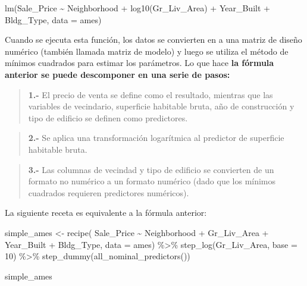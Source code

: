 \documentclass[
]{book}
\newenvironment{Shaded}{\begin{snugshade}}{\end{snugshade}}
\newcommand{\AttributeTok}[1]{\textcolor[rgb]{0.77,0.63,0.00}{#1}}
\newcommand{\DecValTok}[1]{\textcolor[rgb]{0.00,0.00,0.81}{#1}}
\newcommand{\FunctionTok}[1]{\textcolor[rgb]{0.00,0.00,0.00}{#1}}
\newcommand{\NormalTok}[1]{#1}
\newcommand{\OtherTok}[1]{\textcolor[rgb]{0.56,0.35,0.01}{#1}}
\newcommand{\SpecialCharTok}[1]{\textcolor[rgb]{0.00,0.00,0.00}{#1}}
\begin{document}
\begin{Shaded}
\begin{Highlighting}[]
\FunctionTok{lm}\NormalTok{(Sale\_Price }\SpecialCharTok{\textasciitilde{}}\NormalTok{ Neighborhood }\SpecialCharTok{+} \FunctionTok{log10}\NormalTok{(Gr\_Liv\_Area) }\SpecialCharTok{+}\NormalTok{ Year\_Built }\SpecialCharTok{+}\NormalTok{ Bldg\_Type, }\AttributeTok{data =}\NormalTok{ ames)}
\end{Highlighting}
\end{Shaded}

Cuando se ejecuta esta función, los datos se convierten en a una matriz de diseño numérico (también llamada matriz de modelo) y luego se utiliza el método de mínimos cuadrados para estimar los parámetros.
Lo que hace \textbf{la fórmula anterior se puede descomponer en una serie de pasos:}

\begin{quote}
\textbf{1.-} El precio de venta se define como el resultado, mientras que las variables de vecindario, superficie habitable bruta, año de construcción y tipo de edificio se definen como predictores.
\end{quote}

\begin{quote}
\textbf{2.-} Se aplica una transformación logarítmica al predictor de superficie habitable bruta.
\end{quote}

\begin{quote}
\textbf{3.-} Las columnas de vecindad y tipo de edificio se convierten de un formato no numérico a un formato numérico (dado que los mínimos cuadrados requieren predictores numéricos).
\end{quote}

La siguiente receta es equivalente a la fórmula anterior:

\begin{Shaded}
\begin{Highlighting}[]
\NormalTok{simple\_ames }\OtherTok{\textless{}{-}} \FunctionTok{recipe}\NormalTok{(}
\NormalTok{  Sale\_Price }\SpecialCharTok{\textasciitilde{}}\NormalTok{ Neighborhood }\SpecialCharTok{+}\NormalTok{ Gr\_Liv\_Area }\SpecialCharTok{+}\NormalTok{ Year\_Built }\SpecialCharTok{+}\NormalTok{ Bldg\_Type,}
  \AttributeTok{data =}\NormalTok{ ames) }\SpecialCharTok{\%\textgreater{}\%}
  \FunctionTok{step\_log}\NormalTok{(Gr\_Liv\_Area, }\AttributeTok{base =} \DecValTok{10}\NormalTok{) }\SpecialCharTok{\%\textgreater{}\%} 
  \FunctionTok{step\_dummy}\NormalTok{(}\FunctionTok{all\_nominal\_predictors}\NormalTok{())}

\NormalTok{simple\_ames}
\end{Highlighting}
\end{Shaded}
\end{document}

